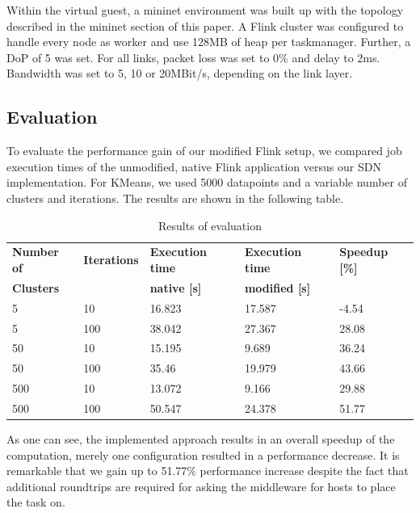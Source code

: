 Within the virtual guest, a mininet environment was built up with the topology described in the
mininet section of this paper. A Flink cluster was configured to handle every node as worker and use
128MB of heap per taskmanager. Further, a DoP of 5 was set. For all links, packet loss was set to 0\%
and delay to 2ms. Bandwidth was set to 5, 10 or 20MBit/s, depending on the link layer.

\subsection{Evaluation}
To evaluate the performance gain of our modified Flink setup, we compared job execution times of the
unmodified, native Flink application versus our SDN implementation. For KMeans, we used 5000
datapoints and a variable number of clusters and iterations. The results are shown in the following
table.

\begin{table}[h]
    \centering
    \begin{tabular}{| l | l | l | l | l | }
        \hline
        \textbf{Number of} & \textbf{Iterations} & \textbf{Execution time}
            & \textbf{Execution time} & \textbf{Speedup [\%]} \\
        \textbf{Clusters} & & \textbf{native [s]} & \textbf{modified [s]} & \\ \hline

        5 & 10 & 16.823 & 17.587 & -4.54 \\ \hline
        5 & 100 & 38.042 & 27.367 & 28.08 \\ \hline
        50 &10 &15.195 &9.689 &36.24 \\ \hline
        50 &100 &35.46 &19.979 &43.66 \\ \hline
        500 &10 &13.072 &9.166 &29.88 \\ \hline
        500 &100 &50.547 &24.378 &51.77 \\ \hline
    \end{tabular}
    \caption{Results of evaluation}
    \label{table:guest_properties}
\end{table}

As one can see, the implemented approach results in an overall speedup of the computation, merely
one configuration resulted in a performance decrease. It is remarkable that we gain up to 51.77\%
performance increase despite the fact that additional roundtrips are required for asking the
middleware for hosts to place the task on.
